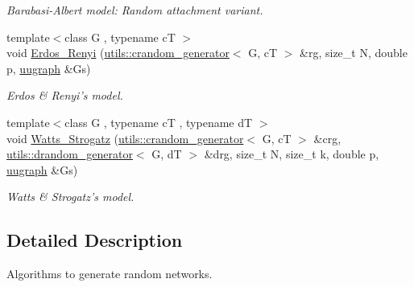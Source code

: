 \begin{DoxyCompactItemize}
\begin{DoxyCompactList}\small\item\em Barabasi-\/\-Albert model\-: Random attachment variant. \end{DoxyCompactList}\item 
{\footnotesize template$<$class G , typename c\-T $>$ }\\void \hyperlink{namespacelgraph_1_1networks_1_1random_a60caa31846c7375914dee572486812f4}{Erdos\-\_\-\-Renyi} (\hyperlink{classlgraph_1_1utils_1_1crandom__generator}{utils\-::crandom\-\_\-generator}$<$ G, c\-T $>$ \&rg, size\-\_\-t N, double p, \hyperlink{classlgraph_1_1uugraph}{uugraph} \&Gs)
\begin{DoxyCompactList}\small\item\em Erdos \& Renyi's model. \end{DoxyCompactList}\item 
{\footnotesize template$<$class G , typename c\-T , typename d\-T $>$ }\\void \hyperlink{namespacelgraph_1_1networks_1_1random_ae9b1c3a417dd89c2b647ffe89173ab65}{Watts\-\_\-\-Strogatz} (\hyperlink{classlgraph_1_1utils_1_1crandom__generator}{utils\-::crandom\-\_\-generator}$<$ G, c\-T $>$ \&crg, \hyperlink{classlgraph_1_1utils_1_1drandom__generator}{utils\-::drandom\-\_\-generator}$<$ G, d\-T $>$ \&drg, size\-\_\-t N, size\-\_\-t k, double p, \hyperlink{classlgraph_1_1uugraph}{uugraph} \&Gs)
\begin{DoxyCompactList}\small\item\em Watts \& Strogatz's model. \end{DoxyCompactList}\end{DoxyCompactItemize}


\subsection{Detailed Description}
Algorithms to generate random networks. 

